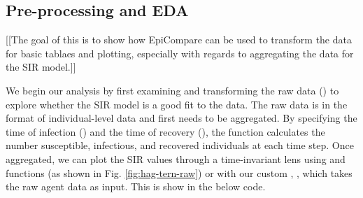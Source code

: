 \documentclass[
  shortnames]{jss}
\begin{document}
\hypertarget{pre-processing-and-eda}{%
\subsection{Pre-processing and EDA}\label{pre-processing-and-eda}}

{[}{[}The goal of this is to show how EpiCompare can be used to
transform the data for basic tablaes and plotting, especially with
regards to aggregating the data for the SIR model.{]}{]}

We begin our analysis by first examining and transforming the raw data
() to explore whether the SIR model is a good fit to
the data. The raw data is in the format of individual-level data and
first needs to be aggregated. By specifying the time of infection
() and the time of recovery (), the function
 calculates the number susceptible,
infectious, and recovered individuals at each time step. Once
aggregated, we can plot the SIR values through a time-invariant lens
using  and  functions (as shown in Fig.
\ref{fig:hag-tern-raw}) or with our custom ,
, which takes the raw agent data as input. This
is show in the below code.
\end{document}
